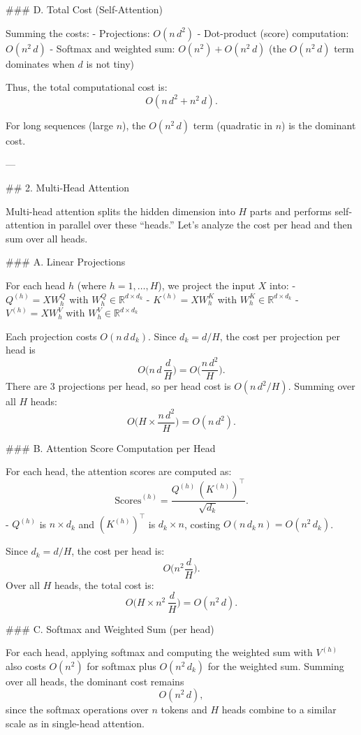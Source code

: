 ### D. Total Cost (Self-Attention)

Summing the costs:
- Projections: \( O(n\, d^2) \)
- Dot-product (score) computation: \( O(n^2\, d) \)
- Softmax and weighted sum: \( O(n^2) + O(n^2\, d) \) (the \( O(n^2\, d) \) term dominates when \( d \) is not tiny)

Thus, the total computational cost is:
\[
O(n\, d^2 + n^2\, d).
\]

For long sequences (large \( n \)), the \( O(n^2\, d) \) term (quadratic in \( n \)) is the dominant cost.

---

## 2. Multi-Head Attention

Multi-head attention splits the hidden dimension into \( H \) parts and performs self-attention in parallel over these “heads.” Let’s analyze the cost per head and then sum over all heads.

### A. Linear Projections

For each head \( h \) (where \( h = 1, \dots, H \)), we project the input \( X \) into:
- \( Q^{(h)} = X W_h^Q \) with \( W_h^Q \in \mathbb{R}^{d \times d_k} \)
- \( K^{(h)} = X W_h^K \) with \( W_h^K \in \mathbb{R}^{d \times d_k} \)
- \( V^{(h)} = X W_h^V \) with \( W_h^V \in \mathbb{R}^{d \times d_k} \)

Each projection costs \( O(n \, d\, d_k) \). Since \( d_k = d / H \), the cost per projection per head is
\[
O\Big(n\, d\, \frac{d}{H}\Big) = O\Big(\frac{n\, d^2}{H}\Big).
\]
There are 3 projections per head, so per head cost is \( O(n\, d^2 / H) \). Summing over all \( H \) heads:
\[
O\Big(H \times \frac{n\, d^2}{H}\Big) = O(n\, d^2).
\]

### B. Attention Score Computation per Head

For each head, the attention scores are computed as:
\[
\text{Scores}^{(h)} = \frac{Q^{(h)} \, (K^{(h)})^\top}{\sqrt{d_k}}.
\]
- \( Q^{(h)} \) is \( n \times d_k \) and \( (K^{(h)})^\top \) is \( d_k \times n \), costing \( O(n\, d_k\, n) = O(n^2\, d_k) \).

Since \( d_k = d / H \), the cost per head is:
\[
O\Big(n^2 \frac{d}{H}\Big).
\]
Over all \( H \) heads, the total cost is:
\[
O\Big(H \times n^2\, \frac{d}{H}\Big) = O(n^2\, d).
\]

### C. Softmax and Weighted Sum (per head)

For each head, applying softmax and computing the weighted sum with \( V^{(h)} \) also costs \( O(n^2) \) for softmax plus \( O(n^2\, d_k) \) for the weighted sum. Summing over all heads, the dominant cost remains
\[
O(n^2\, d),
\]
since the softmax operations over \( n \) tokens and \( H \) heads combine to a similar scale as in single-head attention.

